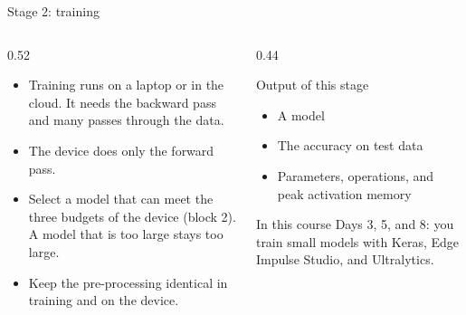 \begin{frame}{Stage 2: training}
  \begin{columns}[T]
    \begin{column}{0.52\textwidth}
      \begin{itemize}
        \item Training runs on a laptop or in the cloud. It needs the
              backward pass and many passes through the data.
        \item The device does only the forward pass.
        \item Select a model that can meet the three budgets of the device
              (block 2). A model that is too large stays too large.
        \item Keep the pre-processing identical in training and on the
              device.
      \end{itemize}
    \end{column}
    \begin{column}{0.44\textwidth}
      \begin{block}{Output of this stage}
        \begin{itemize}
          \item A  model
          \item The accuracy on test data
          \item Parameters, operations, and peak activation memory
        \end{itemize}
      \end{block}
      \begin{block}{In this course}
        Days 3, 5, and 8: you train small models with Keras, Edge Impulse
        Studio, and Ultralytics.
      \end{block}
    \end{column}
  \end{columns}
\end{frame}

